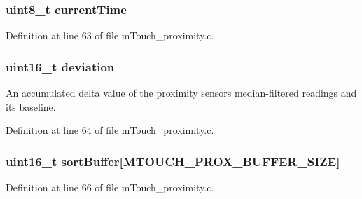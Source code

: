 \subsubsection[{current\+Time}]{\setlength{\rightskip}{0pt plus 5cm}uint8\+\_\+t current\+Time}\label{structm_touch___prox___variables_a54e1af2c7842f193ade514a4bfee0189}


Definition at line 63 of file m\+Touch\+\_\+proximity.\+c.

\hypertarget{structm_touch___prox___variables_aacf98a544e351b33233e438f4a4aaf60}{}
\subsubsection[{deviation}]{\setlength{\rightskip}{0pt plus 5cm}uint16\+\_\+t deviation}\label{structm_touch___prox___variables_aacf98a544e351b33233e438f4a4aaf60}


An accumulated delta value of the proximity sensor\textquotesingle{}s median-\/filtered readings and its baseline. 



Definition at line 64 of file m\+Touch\+\_\+proximity.\+c.

\hypertarget{structm_touch___prox___variables_a41839f2b4a6f1589d77351ff631df82c}{}
\subsubsection[{sort\+Buffer}]{\setlength{\rightskip}{0pt plus 5cm}uint16\+\_\+t sort\+Buffer\mbox{[}M\+T\+O\+U\+C\+H\+\_\+\+P\+R\+O\+X\+\_\+\+B\+U\+F\+F\+E\+R\+\_\+\+S\+I\+Z\+E\mbox{]}}\label{structm_touch___prox___variables_a41839f2b4a6f1589d77351ff631df82c}


Definition at line 66 of file m\+Touch\+\_\+proximity.\+c.

\hypertarget{structm_touch___prox___variables_a38d7d57a2a2c5314834d62a066a3613c}{}
